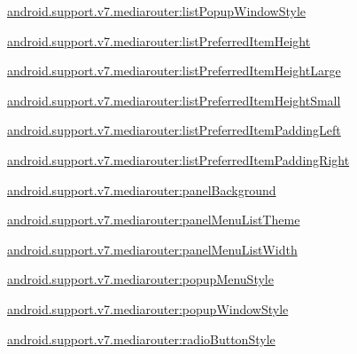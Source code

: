 {\ttfamily \hyperlink{classandroid_1_1support_1_1v7_1_1mediarouter_1_1R_1_1styleable_a20960f3bfbaeac45f2f88f8fdedb6eb8}{android.\+support.\+v7.\+mediarouter\+:list\+Popup\+Window\+Style}}

{\ttfamily \hyperlink{classandroid_1_1support_1_1v7_1_1mediarouter_1_1R_1_1styleable_a93ebe3b2983e9056ade662b59bf906f0}{android.\+support.\+v7.\+mediarouter\+:list\+Preferred\+Item\+Height}}

{\ttfamily \hyperlink{classandroid_1_1support_1_1v7_1_1mediarouter_1_1R_1_1styleable_ab27c1a75e8d929dff26ffcc92b6ae2e9}{android.\+support.\+v7.\+mediarouter\+:list\+Preferred\+Item\+Height\+Large}}

{\ttfamily \hyperlink{classandroid_1_1support_1_1v7_1_1mediarouter_1_1R_1_1styleable_af77cd07fa887ba15990b370f984b0d68}{android.\+support.\+v7.\+mediarouter\+:list\+Preferred\+Item\+Height\+Small}}

{\ttfamily \hyperlink{classandroid_1_1support_1_1v7_1_1mediarouter_1_1R_1_1styleable_adcdce820a384c778b4746b452ffec297}{android.\+support.\+v7.\+mediarouter\+:list\+Preferred\+Item\+Padding\+Left}}

{\ttfamily \hyperlink{classandroid_1_1support_1_1v7_1_1mediarouter_1_1R_1_1styleable_ad7f8ba5273c36438148cf9ec4c052103}{android.\+support.\+v7.\+mediarouter\+:list\+Preferred\+Item\+Padding\+Right}}

{\ttfamily \hyperlink{classandroid_1_1support_1_1v7_1_1mediarouter_1_1R_1_1styleable_a13f22c89f103a45bf6f2cec79f941159}{android.\+support.\+v7.\+mediarouter\+:panel\+Background}}

{\ttfamily \hyperlink{classandroid_1_1support_1_1v7_1_1mediarouter_1_1R_1_1styleable_a7c342f6f92ed7ad34951015f855a9db3}{android.\+support.\+v7.\+mediarouter\+:panel\+Menu\+List\+Theme}}

{\ttfamily \hyperlink{classandroid_1_1support_1_1v7_1_1mediarouter_1_1R_1_1styleable_ab0f7f7adcabb13c0fbfe3555aa27d52e}{android.\+support.\+v7.\+mediarouter\+:panel\+Menu\+List\+Width}}

{\ttfamily \hyperlink{classandroid_1_1support_1_1v7_1_1mediarouter_1_1R_1_1styleable_a56f5c9d8f50624e515a07a5936318b79}{android.\+support.\+v7.\+mediarouter\+:popup\+Menu\+Style}}

{\ttfamily \hyperlink{classandroid_1_1support_1_1v7_1_1mediarouter_1_1R_1_1styleable_a1c2df8e2b925ae4820688441763caf8b}{android.\+support.\+v7.\+mediarouter\+:popup\+Window\+Style}}

{\ttfamily \hyperlink{classandroid_1_1support_1_1v7_1_1mediarouter_1_1R_1_1styleable_a8dc461bdd424e8433282468c37c8d386}{android.\+support.\+v7.\+mediarouter\+:radio\+Button\+Style}}

